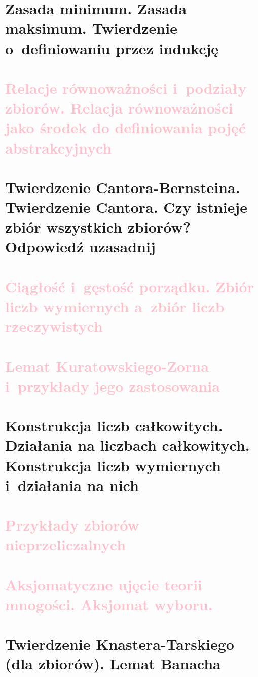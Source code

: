 \section{Zasada minimum. Zasada maksimum. Twierdzenie o~definiowaniu przez indukcję}


\section{\textcolor{pink}{Relacje równoważności i~podziały zbiorów. Relacja równoważności jako środek do definiowania pojęć abstrakcyjnych}}

\section{Twierdzenie Cantora-Bernsteina. Twierdzenie Cantora. Czy istnieje zbiór wszystkich zbiorów? Odpowiedź uzasadnij}


\section{\textcolor{pink}{Ciągłość i~gęstość porządku. Zbiór liczb wymiernych a~zbiór liczb rzeczywistych}}

\section{\textcolor{pink}{Lemat Kuratowskiego-Zorna i~przykłady jego zastosowania}}

\section{Konstrukcja liczb całkowitych. Działania na liczbach całkowitych. Konstrukcja liczb wymiernych i~działania na nich}


\section{\textcolor{pink}{Przykłady zbiorów nieprzeliczalnych}}

\section{\textcolor{pink}{Aksjomatyczne ujęcie teorii mnogości. Aksjomat wyboru.}}

\section{Twierdzenie Knastera-Tarskiego (dla zbiorów). Lemat Banacha}
\label{mfi:knaster_tarski_and_banach}


